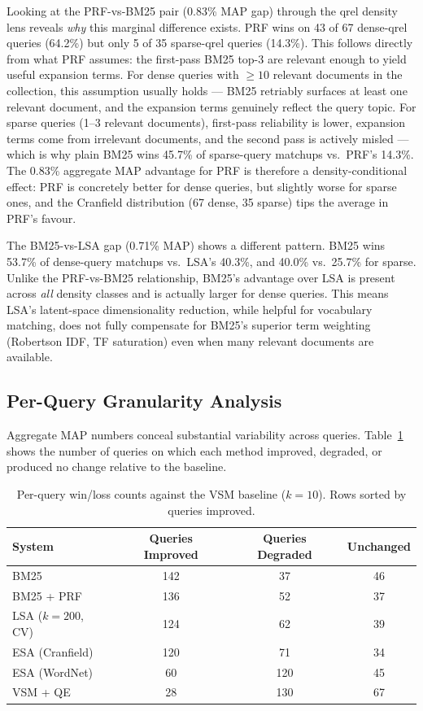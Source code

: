 \documentclass{svproc}
\begin{document}
    Looking at the PRF-vs-BM25 pair (0.83\% MAP gap) through the qrel density lens reveals \emph{why} this marginal difference exists. PRF wins on 43 of 67 dense-qrel queries (64.2\%) but only 5 of 35 sparse-qrel queries (14.3\%). This follows directly from what PRF assumes: the first-pass BM25 top-3 are relevant enough to yield useful expansion terms. For dense queries with $\ge 10$ relevant documents in the collection, this assumption usually holds — BM25 retriably surfaces at least one relevant document, and the expansion terms genuinely reflect the query topic. For sparse queries (1--3 relevant documents), first-pass reliability is lower, expansion terms come from irrelevant documents, and the second pass is actively misled — which is why plain BM25 wins 45.7\% of sparse-query matchups vs.\ PRF's 14.3\%. The 0.83\% aggregate MAP advantage for PRF is therefore a density-conditional effect: PRF is concretely better for dense queries, but slightly worse for sparse ones, and the Cranfield distribution (67 dense, 35 sparse) tips the average in PRF's favour.

    The BM25-vs-LSA gap (0.71\% MAP) shows a different pattern. BM25 wins 53.7\% of dense-query matchups vs.\ LSA's 40.3\%, and 40.0\% vs.\ 25.7\% for sparse. Unlike the PRF-vs-BM25 relationship, BM25's advantage over LSA is present across \emph{all} density classes and is actually larger for dense queries. This means LSA's latent-space dimensionality reduction, while helpful for vocabulary matching, does not fully compensate for BM25's superior term weighting (Robertson IDF, TF saturation) even when many relevant documents are available.

    \subsection{Per-Query Granularity Analysis}

    Aggregate MAP numbers conceal substantial variability across queries. Table~\ref{tab:pq} shows the number of queries on which each method improved, degraded, or produced no change relative to the baseline.

    \begin{table}[H]
    \centering
    \renewcommand{\arraystretch}{1.2}
    \begin{tabular}{lccc}
    \toprule
    \textbf{System} & \textbf{Queries Improved} & \textbf{Queries Degraded} & \textbf{Unchanged} \\
    \midrule
    BM25           & 142 & 37  & 46 \\
    BM25 + PRF     & 136 & 52  & 37 \\
    LSA ($k{=}200$, CV) & 124 & 62  & 39 \\
    ESA (Cranfield)& 120 & 71  & 34 \\
    ESA (WordNet)  & 60  & 120 & 45 \\
    VSM + QE       & 28  & 130 & 67 \\
    \bottomrule
    \end{tabular}
    \caption{Per-query win/loss counts against the VSM baseline ($k{=}10$). Rows sorted by queries improved.}
    \label{tab:pq}
    \end{table}
\end{document}
